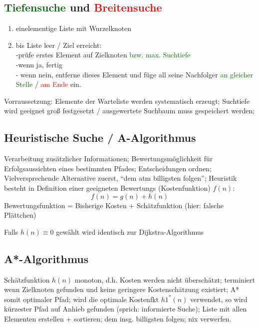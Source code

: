 \documentclass[german,color,6pt]{latex4ei/latex4ei_sheet}
\begin{document}
\begin{sectionbox}
\subsection{\textcolor{darkgreen}{Tiefensuche} und \textcolor{red}{Breitensuche}}
\begin{enumerate}
	\item einelementige Liste mit Wurzelknoten
	\item bis Liste leer / Ziel erreicht: \\ -prüfe erstes Element auf Zielknoten \textcolor{darkgreen}{bzw. max. Suchtiefe} \\-wenn ja, fertig \\ - wenn nein, entferne dieses Element und füge all seine Nachfolger \textcolor{darkgreen}{ an gleicher Stelle} / \textcolor{red}{am Ende} ein.
\end{enumerate}

Vorraussetzung: Elemente der Warteliste werden systematisch erzeugt; Suchtiefe wird geeignet groß festgesetzt / ausgewertete Suchbaum muss gespeichert werden;
\end{sectionbox}

\begin{sectionbox}
\subsection{Heuristische Suche / A-Algorithmus}
Verarbeitung zusätzlicher Informationen; Bewertungsmöglichkeit für Erfolgsaussichten eines bestimmten Pfades; Entscheidungen ordnen; Vielversprechende Alternative zuerst, "`dem atm billigsten folgen"'; Heuristik besteht in Definition einer geeigneten Bewertungs (Kostenfunktion) $f(n)$:
\begin{equation*}
f(n) = g(n) + h(n)
\end{equation*}
Bewertungsfunktion = Bisherige Kosten + Schätzfunktion (hier: falsche Plättchen)

Falls $h(n) \equiv 0$ gewählt wird identisch zur Dijkstra-Algorithmus
\end{sectionbox}

\begin{sectionbox}
\subsection{A*-Algorithmus}
Schätzfunktion $h(n)$ monoton, d.h. Kosten werden nicht überschätzt; terminiert wenn Zielknoten gefunden und keine geringere Kostenschätzung existiert; A* somit optimaler Pfad; wird die optimale Kostenfkt $h1^*(n)$ verwendet, so wird kürzester Pfad auf Anhieb gefunden (sprich: informierte Suche); Liste mit allen Elementen erstellen + sortieren; dem insg. billigsten folgen; nix verwerfen.
\end{sectionbox}
\end{document}
